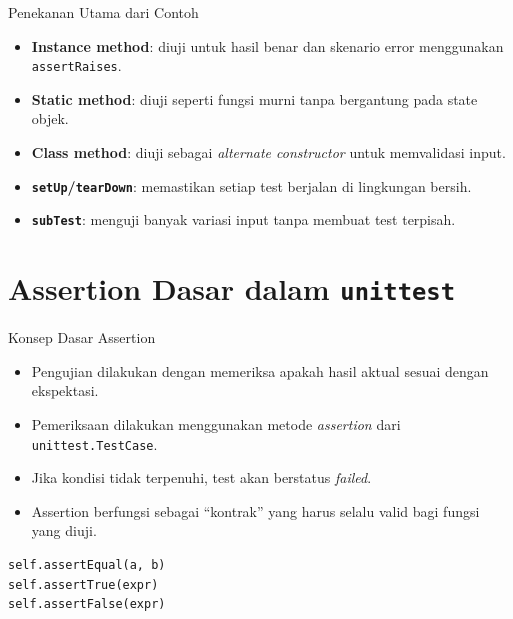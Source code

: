 \documentclass[aspectratio=169, table]{beamer}
\begin{document}
\begin{frame}[fragile]{Penekanan Utama dari Contoh}
\vspace*{20pt}
\begin{itemize}
  \item \textbf{Instance method}: diuji untuk hasil benar dan skenario error menggunakan \texttt{assertRaises}.
  \item \textbf{Static method}: diuji seperti fungsi murni tanpa bergantung pada state objek.
  \item \textbf{Class method}: diuji sebagai \textit{alternate constructor} untuk memvalidasi input.
  \item \textbf{\texttt{setUp}/\texttt{tearDown}}: memastikan setiap test berjalan di lingkungan bersih.
  \item \textbf{\texttt{subTest}}: menguji banyak variasi input tanpa membuat test terpisah.
\end{itemize}
\end{frame}


\section{Assertion Dasar dalam \texttt{unittest}}

\begin{frame}[fragile]{Konsep Dasar Assertion}
\vspace*{20pt}
\begin{itemize}
  \item Pengujian dilakukan dengan memeriksa apakah hasil aktual sesuai dengan ekspektasi.
  \item Pemeriksaan dilakukan menggunakan metode \textit{assertion} dari \texttt{unittest.TestCase}.
  \item Jika kondisi tidak terpenuhi, test akan berstatus \textit{failed}.
  \item Assertion berfungsi sebagai “kontrak” yang harus selalu valid bagi fungsi yang diuji.
\end{itemize}

\begin{lstlisting}[style=PythonStyle]
self.assertEqual(a, b)
self.assertTrue(expr)
self.assertFalse(expr)
\end{lstlisting}
\end{frame}
\end{document}
